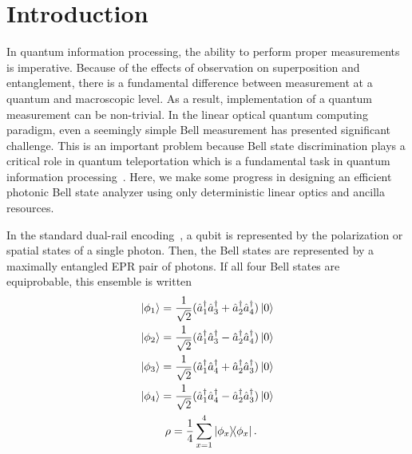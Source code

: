 \documentclass[aps,pra,twocolumn,showpacs,superscriptaddress,floatfix,10pt]{revtex4}
\begin{document}
\section{Introduction}
\label{Intro}
In quantum information processing, the ability to perform proper measurements is imperative. Because of the effects of observation on superposition and entanglement, there is a fundamental difference between measurement at a quantum and macroscopic level. As a result, implementation of a quantum measurement can be non-trivial. In the linear optical quantum computing paradigm, even a seemingly simple Bell measurement has presented significant challenge. This is an important problem because Bell state discrimination plays a critical role in quantum teleportation which is a fundamental task in quantum information processing~\cite{Chuang}. Here, we make some progress in designing an efficient photonic Bell state analyzer using only deterministic linear optics and ancilla resources. 

In the standard dual-rail encoding~\cite{Review Paper}, a qubit is represented by the polarization or spatial states of a single photon. Then, the Bell states are represented by a maximally entangled EPR pair of photons. If all four Bell states are equiprobable, this ensemble is written
\begin{eqnarray}
\label{Bell States Creation Operator 1}
\ket{\phi_1} = \frac{1}{\sqrt{2}} (\hat{a}_1^\dagger \hat{a}_3^\dagger + \hat{a}_2^\dagger \hat{a}_4^\dagger) \ket{0} \\
\label{Bell States Creation Operator 2}
\ket{\phi_2} = \frac{1}{\sqrt{2}} (\hat{a}_1^\dagger \hat{a}_3^\dagger - \hat{a}_2^\dagger \hat{a}_4^\dagger) \ket{0} \\
\label{Bell States Creation Operator 3}
\ket{\phi_3} = \frac{1}{\sqrt{2}} (\hat{a}_1^\dagger \hat{a}_4^\dagger + \hat{a}_2^\dagger \hat{a}_3^\dagger) \ket{0} \\
\label{Bell States Creation Operator 4}
\ket{\phi_4} = \frac{1}{\sqrt{2}} (\hat{a}_1^\dagger \hat{a}_4^\dagger - \hat{a}_2^\dagger \hat{a}_3^\dagger) \ket{0} \\
\label{Bell State Ensemble}
\rho = \frac{1}{4} \sum_{x=1}^{4} \outerproduct{\phi_x}{\phi_x}. \quad  \enspace
\end{eqnarray}
\end{document}
